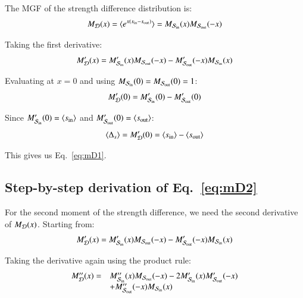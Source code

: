 \documentclass[a4paper,pre,superscriptaddress,floatfix,nofootinbib,twocolumn]{revtex4-1}
\begin{document}
The MGF of the strength difference distribution is:
\[
M_{\cal D}(x) = \langle e^{x (s_\text{in} - s_\text{out})} \rangle = M_{{\cal S}_\text{in}}(x) M_{{\cal S}_\text{out}}(-x)
\]

Taking the first derivative:
\[
M'_{\cal D}(x) = M'_{{\cal S}_\text{in}}(x) M_{{\cal S}_\text{out}}(-x) - M'_{{\cal S}_\text{out}}(-x) M_{{\cal S}_\text{in}}(x)
\]


Evaluating at $x = 0$ and using $M_{{\cal S}_\text{in}}(0) = M_{{\cal S}_\text{out}}(0) = 1$:
\[
M'_{\cal D}(0) = M'_{{\cal S}_\text{in}}(0) - M'_{{\cal S}_\text{out}}(0)
\]

Since $M'_{{\cal S}_\text{in}}(0) = \langle s_\text{in} \rangle$ and $M'_{{\cal S}_\text{out}}(0) = \langle s_\text{out} \rangle$:
\[
\langle \Delta_s \rangle = M'_{\cal D}(0) = \langle s_\text{in} \rangle - \langle s_\text{out} \rangle
\]

This gives us Eq.~\eqref{eq:mD1}.

\subsection*{Step-by-step derivation of Eq.~\eqref{eq:mD2}}

For the second moment of the strength difference, we need the second derivative of $M_{\cal D}(x)$. Starting from:
\[
M'_{\cal D}(x) = M'_{{\cal S}_\text{in}}(x) M_{{\cal S}_\text{out}}(-x) - M'_{{\cal S}_\text{out}}(-x) M_{{\cal S}_\text{in}}(x)
\]

Taking the derivative again using the product rule:
\[
\begin{array}{ll}
M''_{\cal D}(x) = & M''_{{\cal S}_\text{in}}(x) M_{{\cal S}_\text{out}}(-x) - 2 M'_{{\cal S}_\text{in}}(x) M'_{{\cal S}_\text{out}}(-x) \\
& + M''_{{\cal S}_\text{out}}(-x) M_{{\cal S}_\text{in}}(x)
\end{array}
\]

\end{document}
